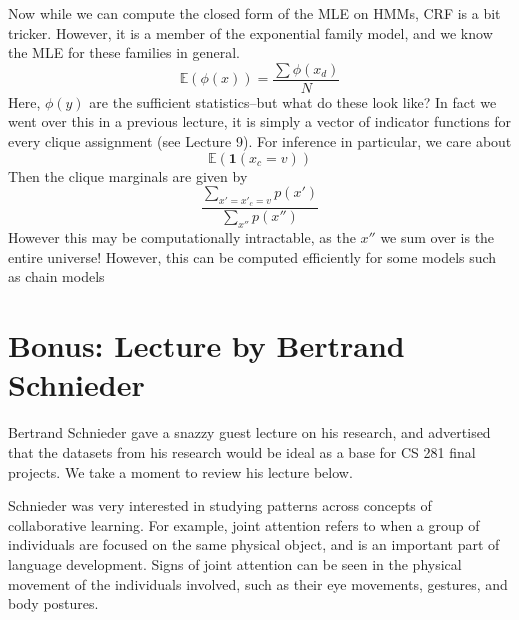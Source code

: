 \documentclass{article}
\begin{document}
Now while we can compute the closed form of the MLE on HMMs, CRF is a bit tricker. However, it is a member of the exponential family model, and we know the MLE for these families in general.
\[
\mathbb{E}(\phi(x)) = \frac{\sum \phi(x_d)}{N}
\]
Here, $\phi(y)$ are the sufficient statistics--but what do these look like? In fact we went over this in a previous lecture, it is simply a vector of indicator functions for every clique assignment (see Lecture 9). For inference in particular, we care about
\[
\mathbb{E}(\textbf{1}(x_c=v))
\]
Then the clique marginals are given by
\[
\frac{\sum\limits_{x'=x'_c=v} p(x')}{\sum\limits_{x''}p(x'')}
\]
However this may be computationally intractable, as the $x''$ we sum over is the entire universe! However, this can be computed efficiently for some models such as chain models

\section{Bonus: Lecture by Bertrand Schnieder}

Bertrand Schnieder gave a snazzy guest lecture on his research, and advertised that the datasets from his research would be ideal as a base for CS 281 final projects.  We take a moment to review his lecture below.

Schnieder was very interested in studying patterns across concepts of collaborative learning. For example, joint attention refers to when a group of individuals are focused on the same physical object, and is an important part of language development. Signs of joint attention can be seen in the physical movement of the individuals involved, such as their eye movements, gestures, and body postures. 
\end{document}

